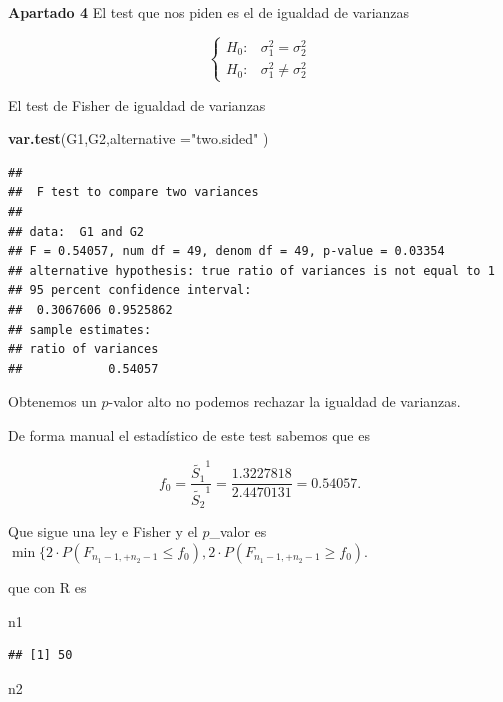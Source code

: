 \documentclass[
]{article}
\newenvironment{Shaded}{\begin{snugshade}}{\end{snugshade}}
\newcommand{\DataTypeTok}[1]{\textcolor[rgb]{0.13,0.29,0.53}{#1}}
\newcommand{\KeywordTok}[1]{\textcolor[rgb]{0.13,0.29,0.53}{\textbf{#1}}}
\newcommand{\NormalTok}[1]{#1}
\newcommand{\StringTok}[1]{\textcolor[rgb]{0.31,0.60,0.02}{#1}}
\begin{document}
\textbf{Apartado 4} El test que nos piden es el de igualdad de varianzas

\[\left\{\begin{array}{ll}H_0: & \sigma_1^2=\sigma_2^2\\
H_0: & \sigma_1^2\not=\sigma_2^2\end{array}\right.\]

El test de Fisher de igualdad de varianzas

\begin{Shaded}
\begin{Highlighting}[]
\KeywordTok{var.test}\NormalTok{(G1,G2,}\DataTypeTok{alternative =}\StringTok{"two.sided"}\NormalTok{ )}
\end{Highlighting}
\end{Shaded}

\begin{verbatim}
## 
##  F test to compare two variances
## 
## data:  G1 and G2
## F = 0.54057, num df = 49, denom df = 49, p-value = 0.03354
## alternative hypothesis: true ratio of variances is not equal to 1
## 95 percent confidence interval:
##  0.3067606 0.9525862
## sample estimates:
## ratio of variances 
##            0.54057
\end{verbatim}

Obtenemos un \(p\)-valor alto no podemos rechazar la igualdad de
varianzas.

De forma manual el estadístico de este test sabemos que es

\[f_0=\frac{\tilde{S_1}^1}{\tilde{S_2}^1}=\frac{1.3227818}{2.4470131}=0.54057.\]

Que sigue una ley e Fisher y el \(p\)\_valor es
\(\min\{2\cdot P(F_{n_1-1,+n_2-1}\leq f_0),2\cdot P(F_{n_1-1,+n_2-1}\geq f_0).\)

que con R es

\begin{Shaded}
\begin{Highlighting}[]
\NormalTok{n1}
\end{Highlighting}
\end{Shaded}

\begin{verbatim}
## [1] 50
\end{verbatim}

\begin{Shaded}
\begin{Highlighting}[]
\NormalTok{n2}
\end{Highlighting}
\end{Shaded}
\end{document}
